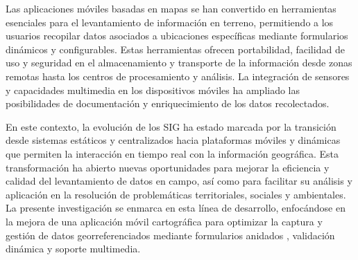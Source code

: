 \documentclass[12pt, a4paper]{book}
\begin{document}
Las aplicaciones móviles basadas en mapas se han convertido en herramientas esenciales para el levantamiento de información en terreno, permitiendo a los usuarios recopilar datos asociados a ubicaciones específicas mediante formularios dinámicos y configurables. Estas herramientas ofrecen portabilidad, facilidad de uso y seguridad en el almacenamiento y transporte de la información desde zonas remotas hasta los centros de procesamiento y análisis. La integración de sensores y capacidades multimedia en los dispositivos móviles ha ampliado las posibilidades de documentación y enriquecimiento de los datos recolectados.

En este contexto, la evolución de los SIG ha estado marcada por la transición desde sistemas estáticos y centralizados hacia plataformas móviles y dinámicas que permiten la interacción en tiempo real con la información geográfica. Esta transformación ha abierto nuevas oportunidades para mejorar la eficiencia y calidad del levantamiento de datos en campo, así como para facilitar su análisis y aplicación en la resolución de problemáticas territoriales, sociales y ambientales. La presente investigación se enmarca en esta línea de desarrollo, enfocándose en la mejora de una aplicación móvil cartográfica para optimizar la captura y gestión de datos georreferenciados mediante formularios anidados \cite{ceri1984}, validación dinámica y soporte multimedia.
\end{document}
